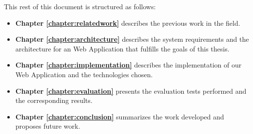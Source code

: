 This rest of this document is structured as follows:

\begin{itemize}
\item \textbf{Chapter \ref{chapter:relatedwork}} describes the previous work in the field.
\item \textbf{Chapter \ref{chapter:architecture}} describes the system requirements and the architecture for an Web Application that fulfills the goals of this thesis.
\item \textbf{Chapter \ref{chapter:implementation}} describes the implementation of our Web Application and the technologies chosen.
\item \textbf{Chapter \ref{chapter:evaluation}} presents the evaluation tests performed and the corresponding results.
\item \textbf{Chapter \ref{chapter:conclusion}} summarizes the work developed and proposes future work.
\end{itemize}

\cleardoublepage
